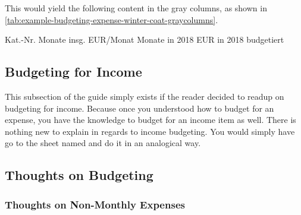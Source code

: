 This would yield the following content in the gray columns, as shown in \autoref{tab:example-budgeting-expense-winter-coat-graycolumns}.

\begin{center}
\label{tab:example-budgeting-expense-winter-coat-}
Kat.-Nr.	Monate insg.	EUR/Monat	Monate in 2018	EUR in 2018	budgetiert

\end{center}

\subsection{Budgeting for Income}
\label{subsec:budgeting-income}

This subsection of the guide simply exists if the reader decided to readup on budgeting for income.
Because once you understood how to budget for an expense, you have the knowledge to budget for an income item as well.
There is nothing new to explain in regards to income budgeting.
You would simply have go to the sheet named  and do it in an analogical way.

\subsection{Thoughts on Budgeting}
\label{subsubsec:thoughts-on-budgeting}

\subsubsection{Thoughts on Non-Monthly Expenses}
\label{subsubsec:thoughts-non-monthly-expenses}

